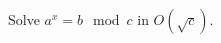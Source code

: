Solve $a^x=b\mod c$ in $O(\sqrt{c})$.

\inputminted{cpp}{src/mathematics/equality-and-inequality/baby-step-giant-step.cpp.com}

